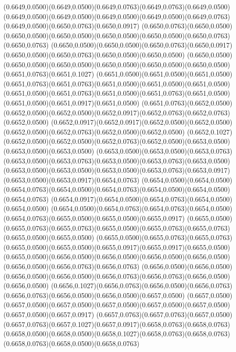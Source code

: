 (0.6649,0.0500)(0.6649,0.0500)(0.6649,0.0763)(0.6649,0.0763)(0.6649,0.0500)
\PST@Solid(0.6649,0.0500)(0.6649,0.0500)(0.6649,0.0500)(0.6649,0.0500)(0.6649,0.0763)(0.6649,0.0500)(0.6650,0.0763)(0.6650,0.0917)
(0.6650,0.0763)(0.6650,0.0500)(0.6650,0.0500)(0.6650,0.0500)(0.6650,0.0500)(0.6650,0.0500)(0.6650,0.0763)(0.6650,0.0763)
(0.6650,0.0500)(0.6650,0.0500)(0.6650,0.0763)(0.6650,0.0917)(0.6650,0.0500)(0.6650,0.0763)(0.6650,0.0500)(0.6650,0.0500)
(0.6650,0.0500)(0.6650,0.0500)(0.6650,0.0500)(0.6650,0.0500)(0.6650,0.0500)(0.6650,0.0500)(0.6651,0.0763)(0.6651,0.1027)
(0.6651,0.0500)(0.6651,0.0500)(0.6651,0.0500)(0.6651,0.0763)(0.6651,0.0763)(0.6651,0.0500)(0.6651,0.0500)(0.6651,0.0500)
(0.6651,0.0500)(0.6651,0.0763)(0.6651,0.0500)(0.6651,0.0763)(0.6651,0.0500)(0.6651,0.0500)(0.6651,0.0917)(0.6651,0.0500)
(0.6651,0.0763)(0.6652,0.0500)(0.6652,0.0500)(0.6652,0.0500)(0.6652,0.0917)(0.6652,0.0763)(0.6652,0.0763)(0.6652,0.0500)
(0.6652,0.0917)(0.6652,0.0917)(0.6652,0.0500)(0.6652,0.0500)(0.6652,0.0500)(0.6652,0.0763)(0.6652,0.0500)(0.6652,0.0500)
(0.6652,0.1027)(0.6652,0.0500)(0.6652,0.0500)(0.6652,0.0763)(0.6652,0.0500)(0.6653,0.0500)(0.6653,0.0500)(0.6653,0.0500)
(0.6653,0.0500)(0.6653,0.0500)(0.6653,0.0763)(0.6653,0.0500)(0.6653,0.0763)(0.6653,0.0500)(0.6653,0.0763)(0.6653,0.0500)
(0.6653,0.0500)(0.6653,0.0500)(0.6653,0.0500)(0.6653,0.0763)(0.6653,0.0917)(0.6653,0.0500)(0.6653,0.0917)(0.6654,0.0763)
(0.6654,0.0500)(0.6654,0.0500)(0.6654,0.0763)(0.6654,0.0500)(0.6654,0.0763)(0.6654,0.0500)(0.6654,0.0500)(0.6654,0.0763)
(0.6654,0.0917)(0.6654,0.0500)(0.6654,0.0763)(0.6654,0.0500)(0.6654,0.0500)
\PST@Solid(0.6654,0.0500)(0.6654,0.0763)(0.6654,0.0763)(0.6654,0.0500)(0.6654,0.0763)(0.6655,0.0500)(0.6655,0.0500)(0.6655,0.0917)
(0.6655,0.0500)(0.6655,0.0763)(0.6655,0.0763)(0.6655,0.0500)(0.6655,0.0763)(0.6655,0.0763)(0.6655,0.0500)(0.6655,0.0500)
(0.6655,0.0500)(0.6655,0.0763)(0.6655,0.0763)(0.6655,0.0500)(0.6655,0.0500)(0.6655,0.0917)(0.6655,0.0917)(0.6655,0.0500)
(0.6655,0.0500)(0.6656,0.0500)(0.6656,0.0500)(0.6656,0.0500)(0.6656,0.0500)(0.6656,0.0500)(0.6656,0.0763)(0.6656,0.0763)
(0.6656,0.0500)(0.6656,0.0500)(0.6656,0.0500)(0.6656,0.0500)(0.6656,0.0763)(0.6656,0.0763)(0.6656,0.0500)(0.6656,0.0500)
(0.6656,0.1027)(0.6656,0.0763)(0.6656,0.0500)(0.6656,0.0763)(0.6656,0.0763)(0.6656,0.0500)(0.6656,0.0500)(0.6657,0.0500)
(0.6657,0.0500)(0.6657,0.0500)(0.6657,0.0500)(0.6657,0.0500)(0.6657,0.0500)(0.6657,0.0500)(0.6657,0.0500)(0.6657,0.0917)
(0.6657,0.0763)(0.6657,0.0763)(0.6657,0.0500)(0.6657,0.0763)(0.6657,0.1027)(0.6657,0.0917)(0.6658,0.0763)(0.6658,0.0763)
(0.6658,0.0500)(0.6658,0.0500)(0.6658,0.1027)(0.6658,0.0763)(0.6658,0.0763)(0.6658,0.0763)(0.6658,0.0500)(0.6658,0.0763)
